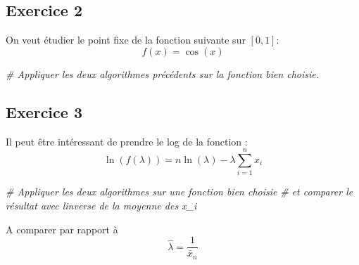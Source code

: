 \documentclass[
]{article}
\newenvironment{Shaded}{\begin{snugshade}}{\end{snugshade}}
\newcommand{\CommentTok}[1]{\textcolor[rgb]{0.56,0.35,0.01}{\textit{#1}}}
\begin{document}
\hypertarget{exercice-2}{%
\subsection{Exercice 2}\label{exercice-2}}

On veut étudier le point fixe de la fonction suivante sur \([0,1]\): \[
f(x) =  \cos(x)
\]

\begin{Shaded}
\begin{Highlighting}[]
\CommentTok{\# Appliquer les deux algorithmes précédents sur la fonction bien choisie.}
\end{Highlighting}
\end{Shaded}

\hypertarget{exercice-3}{%
\subsection{Exercice 3}\label{exercice-3}}

Il peut être intéressant de prendre le log de la fonction : \[
\ln(f(\lambda)) = n\ln(\lambda) - \lambda \sum_{i=1}^n x_i
\]

\begin{Shaded}
\begin{Highlighting}[]
\CommentTok{\# Appliquer les deux algorithmes sur une fonction bien choisie }
\CommentTok{\# et comparer le résultat avec l\textquotesingle{}inverse de la moyenne des x\_i}
\end{Highlighting}
\end{Shaded}

A comparer par rapport à \[
\hat{\lambda} = \frac{1}{\bar{x}_n}
\]
\end{document}
